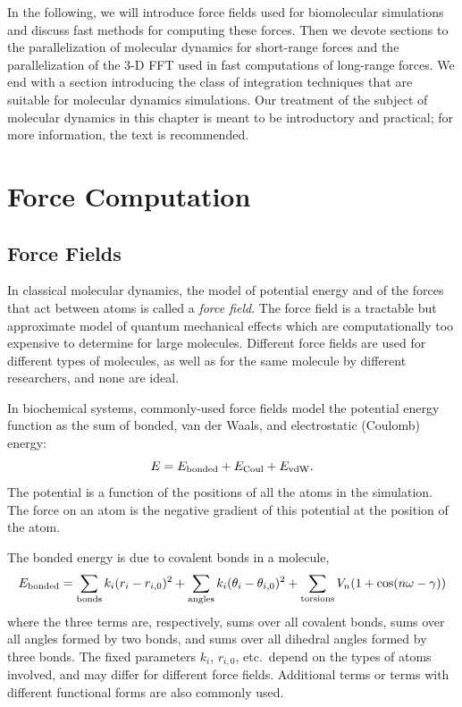 In the following, we will introduce force fields used for biomolecular
simulations and discuss fast methods for computing these forces.
Then we devote sections to the parallelization of molecular dynamics for
short-range forces and the parallelization of the 3-D FFT used in fast
computations of long-range forces.  We end with a section introducing
the class of integration techniques that are suitable for molecular
dynamics simulations.  Our treatment of the subject of molecular dynamics
in this chapter is meant to be introductory and practical; for more
information, the text \cite{frenkel-smit} is recommended.


\section{Force Computation}

\subsection{Force Fields}

In classical molecular dynamics, the model of potential energy and of the
forces that act between atoms is called a {\em force field}.  The force
field is a tractable but approximate model of quantum mechanical effects
which are computationally too expensive to determine for large molecules.
Different force fields are used for different types of molecules, as well
as for the same molecule by different researchers, and none are ideal.

In biochemical systems, commonly-used force fields model the potential energy function 
as the sum of bonded, van der Waals, and electrostatic (Coulomb) energy:
\[
E = E_{\rm bonded} + E_{\rm Coul} + E_{\rm vdW}.
\]
The potential is a function of the positions of all the atoms in the simulation.
The force on an atom is the negative gradient of this potential at the 
position of the atom.  

The bonded energy is due to covalent bonds in a molecule,
\[
E_{\rm bonded} = \sum_{\rm bonds} k_i (r_i - r_{i,0})^2 + 
                 \sum_{\rm angles} k_i ( \theta_i - \theta_{i,0})^2 +
                 \sum_{\rm torsions} V_n(1+\cos(n \omega - \gamma))
\]
where the three terms are, respectively,
sums over all covalent bonds, sums over all angles formed by two bonds, and
sums over all dihedral angles formed by three bonds.  The fixed parameters 
$k_i$, $r_{i,0}$, etc.\ depend on the types of atoms involved, and
may differ for different force fields.  Additional terms or terms with
different functional forms are also commonly used.

